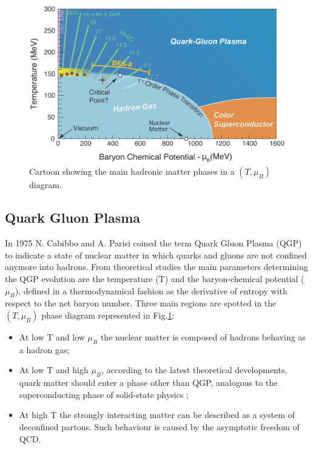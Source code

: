 \begin{figure}[!t]
\begin{center}
\includegraphics[width=0.85\linewidth]{Chapters/Introduction/Figs/QGPPhases.pdf}
\caption{Cartoon showing the main hadronic matter phases in a $(T,\mu_B)$ diagram.}
\label{fig:QGPPhases}
\end{center}
\end{figure}

\subsection{Quark Gluon Plasma}
In 1975 N. Cabibbo and A. Parisi \cite{Cabibbo:1975ig} coined the term Quark Gluon Plasma (QGP) to indicate a state of nuclear matter in which quarks and gluons are not confined anymore into hadrons.
From theoretical studies the main parameters determining the QGP evolution are the temperature (T) and the baryon-chemical potential ($\mu_B$), defined in a thermodynamical fashion as the derivative of entropy with respect to the net baryon number.
Three main regions are spotted in the $(T,\mu_B)$ phase diagram represented in Fig.\ref{fig:QGPPhases}:
\begin{itemize}
    \item At low T and low $\mu_B$ the nuclear matter is composed of hadrons behaving as a hadron gas;
    \item At low T and high $\mu_B$, according to the latest theoretical developments, quark matter should enter a phase other than QGP, analogous to the superconducting phase of solid-state physics \cite{Alford:2007xm};
    \item At high T the strongly interacting matter can be described as a system of deconfined partons. Such behaviour is caused by the asymptotic freedom of QCD.
\end{itemize}

